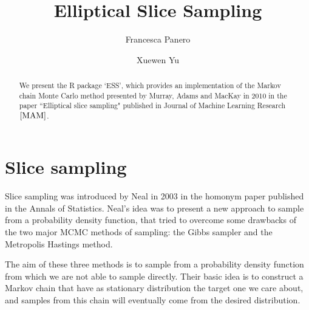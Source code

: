 \documentclass{article}
\title{Elliptical Slice Sampling}
\author{Francesca Panero \and Xuewen Yu}
\begin{document}


\maketitle

\begin{abstract}
We present the R package `ESS', which provides an implementation of the Markov chain Monte Carlo method presented by Murray, Adams and MacKay in 2010 in the paper ``Elliptical slice sampling" published in Journal of Machine Learning Research $\cite{MAM}$.
\end{abstract}

\section{Slice sampling}

Slice sampling was introduced by Neal in 2003 \cite{Neal2003} in the homonym paper published in the Annals of Statistics. Neal's idea was to present a new approach to sample from a probability density function, that tried to overcome some drawbacks of the two major MCMC methods of sampling: the Gibbs sampler and the Metropolis Hastings method.

The aim of these three methods is to sample from a probability density function from which we are not able to sample directly. Their basic idea is to construct a Markov chain that have as stationary distribution the target one we care about, and samples from this chain will eventually come from the desired distribution. 
\end{document}
